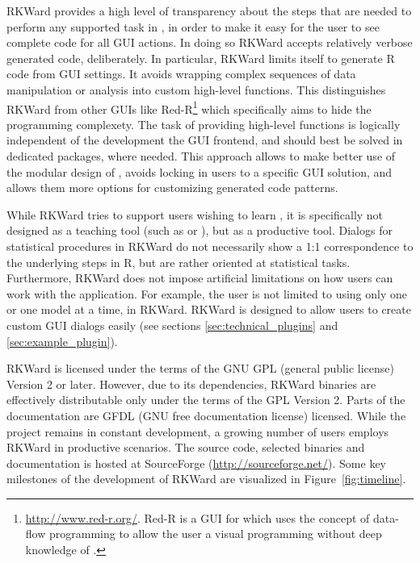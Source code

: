 RKWard provides a high level of transparency about the steps that are needed to
perform any supported task in , in order to make it easy for the user to see
complete code for all GUI actions. In doing so RKWard accepts relatively verbose
generated code, deliberately. In particular, RKWard limits itself to generate R
code from GUI settings. It avoids wrapping complex sequences of data
manipulation or analysis into custom high-level  functions. This distinguishes RKWard from 
other  GUIs like Red-R\footnote{\url{http://www.red-r.org/}.
Red-R is a GUI for  which uses the concept of data-flow
programming \citep{Sutherland1966} to allow the
user a visual programming without deep knowledge of
.} which specifically aims to hide the
programming complexety. The task of
providing high-level functions is logically independent of the development the
GUI frontend, and should best be solved in dedicated  packages, where needed.
This approach allows to make better use of the modular design of , avoids
locking in users to a specific GUI solution, and allows them more options for
customizing generated code patterns.

While RKWard tries to support users wishing to learn , it is specifically not
designed as a teaching tool (such as  or ), but as
a productive tool. Dialogs for statistical procedures in RKWard do not
necessarily show a 1:1 correspondence to the underlying steps in R, but are
rather oriented at statistical tasks. Furthermore, RKWard does not impose
artificial limitations on how users can work with the application. For example,
the user is not limited to using only one  or one model at a
time, in RKWard. RKWard is designed to allow users to create custom GUI dialogs
easily (see sections \ref{sec:technical_plugins} and \ref{sec:example_plugin}).

RKWard is licensed under the terms of the GNU GPL (general public license) Version 2
or later. However, due to its dependencies, RKWard binaries are effectively
distributable only under the terms of the GPL Version 2. Parts of the documentation are
GFDL (GNU free documentation license) licensed. While the project remains in constant development, a growing
number of users employs RKWard in productive scenarios. The source code,
selected binaries and documentation is hosted at SourceForge
(\url{http://sourceforge.net/}). Some key milestones of the development of RKWard are
visualized in Figure~\ref{fig:timeline}.

